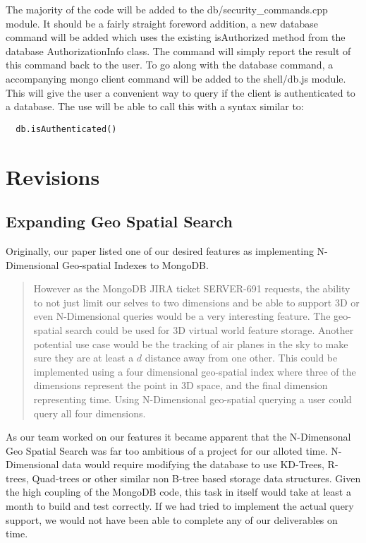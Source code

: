 \documentclass{dependencies/acm_proc_article-sp}
\begin{document}
The majority of the code will be added to the db/security\_commands.cpp module.
It should be a fairly straight foreword addition, a new database command will be
added which uses the existing isAuthorized method from the database AuthorizationInfo
class. The command will simply report the result of this command back to the user.
To go along with the database command, a accompanying mongo client command will be
added to the shell/db.js module. This will give the user a convenient way to query
if the client is authenticated to a database. The use will be able to call this
with a syntax similar to:
\begin{lstlisting}
  db.isAuthenticated()
\end{lstlisting}


\newpage

\section{Revisions}

\subsection{Expanding Geo Spatial Search}

Originally, our paper listed one of our desired features as implementing N-Dimensional
Geo-spatial Indexes to MongoDB.
\begin{quote}
However as the MongoDB JIRA ticket SERVER-691\cite{9} requests, the ability to
not just limit our selves to two dimensions and be able to support 3D or even N-Dimensional
queries would be a very interesting feature. The geo-spatial search could be used for
3D virtual world feature storage. Another potential use case would be the tracking of air planes
in the sky to make sure they are at least a $d$ distance away from one other.
This could be implemented using a four dimensional geo-spatial index where three of the dimensions
represent the point in 3D space, and the final dimension representing time. Using N-Dimensional
geo-spatial querying a user could query all four dimensions.
\end{quote}
As our team worked on our features it became apparent that the N-Dimensonal Geo
Spatial Search was far too ambitious of a project for our alloted time.
N-Dimensional data would require modifying the database to use KD-Trees,
R-trees, Quad-trees or other similar non B-tree based storage data structures.
Given the high coupling of the MongoDB code, this task in itself would take
at least a month to build and test correctly.
If we had tried to implement the actual query support, we would not have been able
to complete any of our deliverables on time.
\end{document}
